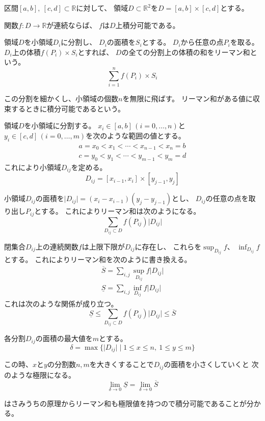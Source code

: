 \documentclass[12pt,b5paper]{ltjsarticle}
\begin{document}
区間$[a,b],\ [c,d]\subset\mathbb{R}$に対して、
領域$D\subset\mathbb{R}^2$を$D=[a,b]\times[c,d]$とする。

関数$f:D\rightarrow \mathbb{R}$が連続ならば、
$f$は$D$上積分可能である。

\hrulefill


領域$D$を小領域$D_i$に分割し、
$D_i$の面積を$S_i$とする。
$D_i$から任意の点$P_i$を取る。
$D_i$上の体積$f(P_i)\times S_i$とすれば、
$D$の全ての分割上の体積の和をリーマン和という。
\begin{equation}
 \sum_{i=1}^n f(P_i)\times S_i
\end{equation}

この分割を細かくし、小領域の個数$n$を無限に飛ばす。
リーマン和がある値に収束するときに積分可能であるという。

\dotfill

領域$D$を小領域に分割する。
$x_i\in [a,b] \, (i=0,\dots,n)$と
$y_i\in [c,d] \, (i=0,\dots,m)$を次のような範囲の値とする。
\begin{gather}
 a = x_0 < x_1 < \cdots < x_{n-1} < x_n = b\\
 c = y_0 < y_1 < \cdots < y_{m-1} < y_m = d
\end{gather}
これにより小領域$D_{ij}$を定める。
\begin{equation}
 D_{ij} = [x_{i-1},x_i]\times[y_{j-1},y_j]
\end{equation}

小領域$D_{ij}$の面積を$\lvert D_{ij}\lvert=(x_i-x_{i-1})(y_j-y_{j-1})$とし、
$D_{ij}$の任意の点を取り出し$P_{ij}$とする。
これによりリーマン和は次のようになる。
\begin{equation}
 \sum_{D_{ij}\subset D} f(P_{ij})\lvert D_{ij}\lvert
\end{equation}




閉集合$D_{ij}$上の連続関数$f$は上限下限が$D_{ij}$に存在し、
これらを$\sup_{D_{ij}} f$、
$\inf_{D_{ij}} f$とする。
これによりリーマン和を次のように書き換える。
\begin{gather}
 \overline{S}=\sum_{i,j} \sup_{D_{ij}} f\lvert D_{ij}\lvert\\
 \underline{S}=\sum_{i,j} \inf_{D_{ij}} f\lvert D_{ij}\lvert
\end{gather}
これは次のような関係が成り立つ。
\begin{equation}
 \underline{S} \leq
  \sum_{D_{ij}\subset D} f(P_{ij})\lvert D_{ij}\lvert
  \leq \overline{S}
\end{equation}

各分割$D_{ij}$の面積の最大値を$m$とする。
\begin{equation}
 \delta = \max\{ \lvert D_{ij} \rvert \mid 1\leq x\leq n,\ 1\leq y\leq m \}
\end{equation}

この時、$x$と$y$の分割数$n,m$を大きくすることで$D_{ij}$の面積を小さくしていくと
次のような極限になる。
\begin{equation}
 \lim_{\delta\rightarrow 0} \underline{S}
  =
  \lim_{\delta\rightarrow 0} \overline{S}
\end{equation}

はさみうちの原理からリーマン和も極限値を持つので積分可能であることが分かる。
\end{document}
